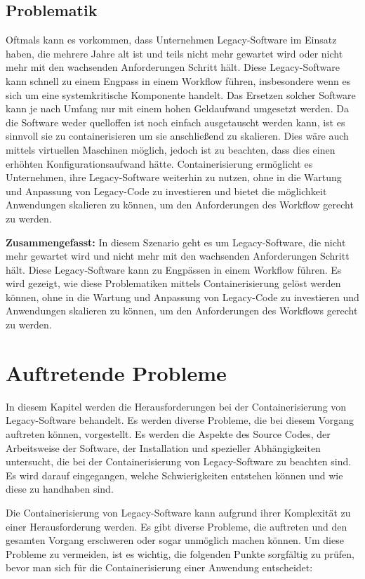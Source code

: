 \subsection{Problematik}
Oftmals kann es vorkommen, dass Unternehmen Legacy-Software im Einsatz haben, die mehrere Jahre alt ist und teils nicht mehr gewartet wird oder nicht mehr mit den wachsenden Anforderungen Schritt hält. Diese Legacy-Software kann schnell zu einem Engpass in einem Workflow führen, insbesondere wenn es sich um eine systemkritische Komponente handelt. Das Ersetzen solcher Software kann je nach Umfang nur mit einem hohen Geldaufwand umgesetzt werden. Da die Software weder quelloffen ist noch einfach ausgetauscht werden kann, ist es sinnvoll sie zu containerisieren um sie anschließend zu skalieren. Dies wäre auch mittels virtuellen Maschinen möglich, jedoch ist zu beachten, dass dies einen erhöhten Konfigurationsaufwand hätte. Containerisierung ermöglicht es Unternehmen, ihre Legacy-Software weiterhin zu nutzen, ohne in die Wartung und Anpassung von Legacy-Code zu investieren und bietet die möglichkeit Anwendungen skalieren zu können, um den Anforderungen des Workflow gerecht zu werden.

\textbf{Zusammengefasst:}
In diesem Szenario geht es um Legacy-Software, die nicht mehr gewartet wird und nicht mehr mit den wachsenden Anforderungen Schritt hält. Diese Legacy-Software kann zu Engpässen in einem Workflow führen.
Es wird gezeigt, wie diese Problematiken mittels Containerisierung gelöst werden können, ohne in die Wartung und Anpassung von Legacy-Code zu investieren und Anwendungen skalieren zu können, um den Anforderungen des Workflows gerecht zu werden.
\section{Auftretende Probleme}

In diesem Kapitel werden die Herausforderungen bei der Containerisierung von Legacy-Software behandelt. Es werden diverse Probleme, die bei diesem Vorgang auftreten können, vorgestellt. Es werden die Aspekte des Source Codes, der Arbeitsweise der Software, der Installation und spezieller Abhängigkeiten untersucht, die bei der Containerisierung von Legacy-Software zu beachten sind. Es wird darauf eingegangen, welche Schwierigkeiten entstehen können und wie diese zu handhaben sind.

Die Containerisierung von Legacy-Software kann aufgrund ihrer Komplexität zu einer Herausforderung werden. Es gibt diverse Probleme, die auftreten und den gesamten Vorgang erschweren oder sogar unmöglich machen können. Um diese Probleme zu vermeiden, ist es wichtig, die folgenden Punkte sorgfältig zu prüfen, bevor man sich für die Containerisierung einer Anwendung entscheidet:

